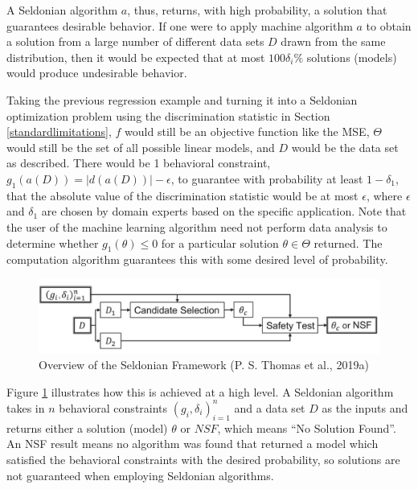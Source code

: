 \documentclass[12pt, twoside]{amherstthesis}
\begin{document}
A Seldonian algorithm \(a\), thus, returns, with high probability, a solution that guarantees desirable behavior. If one were to apply machine algorithm \(a\) to obtain a solution from a large number of different data sets \(D\) drawn from the same distribution, then it would be expected that at most \(100\delta_i \%\) solutions (models) would produce undesirable behavior.

Taking the previous regression example and turning it into a Seldonian optimization problem using the discrimination statistic in Section \ref{standardlimitations}, \(f\) would still be an objective function like the MSE, \(\Theta\) would still be the set of all possible linear models, and \(D\) would be the data set as described. There would be 1 behavioral constraint, \(g_1(a(D)) = |d(a(D))| - \epsilon\), to guarantee with probability at least \(1-\delta_1\), that the absolute value of the discrimination statistic would be at most \(\epsilon\), where \(\epsilon\) and \(\delta_1\) are chosen by domain experts based on the specific application. Note that the user of the machine learning algorithm need not perform data analysis to determine whether \(g_1(\theta) \leq 0\) for a particular solution \(\theta \in \Theta\) returned. The computation algorithm guarantees this with some desired level of probability.
\begin{figure}

{\centering \includegraphics[width=1\linewidth]{figures/seldonian1} 

}

\caption[Overview of the Seldonian Framework]{Overview of the Seldonian Framework (P. S. Thomas et al., 2019a)}\label{fig:seldonian1}
\end{figure}
Figure \ref{fig:seldonian1} illustrates how this is achieved at a high level. A Seldonian algorithm takes in \(n\) behavioral constraints \((g_i,\delta_i)_{i=1}^n\) and a data set \(D\) as the inputs and returns either a solution (model) \(\theta\) or \(NSF\), which means ``No Solution Found''. An NSF result means no algorithm was found that returned a model which satisfied the behavioral constraints with the desired probability, so solutions are not guaranteed when employing Seldonian algorithms.
\end{document}

